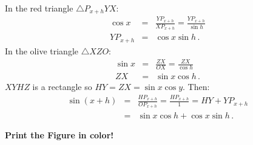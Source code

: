 In the red triangle $\triangle P_{x+h}YX$:
\begin{eqnarray*}
\cos x  &=& \frac{YP_{x+h}}{XP_{x+h}}
              = \frac{YP_{x+h}}{\sin h}\\
YP_{x+h}&=& \cos x\sin h\,.
\end{eqnarray*}
In the olive triangle $\triangle XZO$:
\begin{eqnarray*}
\sin x &=& \frac{ZX}{OX}
             = \frac{ZX}{\cos h}\\
ZX     &=& \sin x\cos h\,.
\end{eqnarray*}
$XYHZ$ is a rectangle so $HY=ZX=\sin x \cos y$. Then:
\begin{eqnarray*}
\sin(x+h) &=& \frac{HP_{x+h}}{OP_{x+h}}
                = \frac{HP_{x+h}}{1}
                = HY+YP_{x+h}\\
          &=& \sin x \cos h+\cos x\sin h\,.
\end{eqnarray*}

\newpage
\begin{center}
\textbf{\large Print the Figure in color!}
\end{center}

\bigskip
\bigskip

